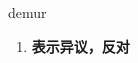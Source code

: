 
\begin{frame}
{\huge demur}
\begin{center}
\begin{enumerate}\Large
  \item \textbf{表示异议，反对}
\end{enumerate}
\end{center}
\end{frame}
